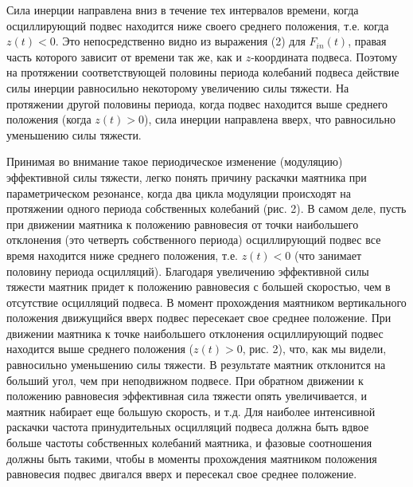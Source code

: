 \documentclass[a4paper,12pt]{article} %
\begin{document}
Сила инерции направлена вниз в течение тех интервалов времени, когда осциллирующий подвес находится ниже своего среднего положения, т.е. когда $z(t) < 0$. Это непосредственно видно из выражения (2) для $F_{in}(t)$, правая часть которого зависит от времени так же, как и $z$-координата подвеса. Поэтому на протяжении соответствующей половины периода колебаний подвеса действие силы инерции равносильно некоторому увеличению силы тяжести. На протяжении другой половины периода, когда подвес находится выше среднего положения (когда $z(t) > 0$), сила инерции направлена вверх, что равносильно уменьшению силы тяжести.

Принимая во внимание такое периодическое изменение (модуляцию) эффективной силы тяжести, легко понять причину раскачки маятника при параметрическом резонансе, когда два цикла модуляции происходят на протяжении одного периода собственных колебаний (рис. 2). В самом деле, пусть при движении маятника к положению равновесия от точки наибольшего отклонения (это четверть собственного периода) осциллирующий подвес все время находится ниже среднего положения, т.е. $z(t) < 0$ (что занимает половину периода осцилляций). Благодаря увеличению эффективной силы тяжести маятник придет к положению равновесия с большей скоростью, чем в отсутствие осцилляций подвеса. В момент прохождения маятником вертикального положения движущийся вверх подвес пересекает свое среднее положение. При движении маятника к точке наибольшего отклонения осциллирующий подвес находится выше среднего положения ($z(t) > 0$, рис. 2), что, как мы видели, равносильно уменьшению силы тяжести. В результате маятник отклонится на больший угол, чем при неподвижном подвесе. При обратном движении к положению равновесия эффективная сила тяжести опять увеличивается, и маятник набирает еще большую скорость, и т.д. Для наиболее интенсивной раскачки частота принудительных осцилляций подвеса должна быть вдвое больше частоты собственных колебаний маятника, и фазовые соотношения должны быть такими, чтобы в моменты прохождения маятником положения равновесия подвес двигался вверх и пересекал свое среднее положение.
\end{document}
